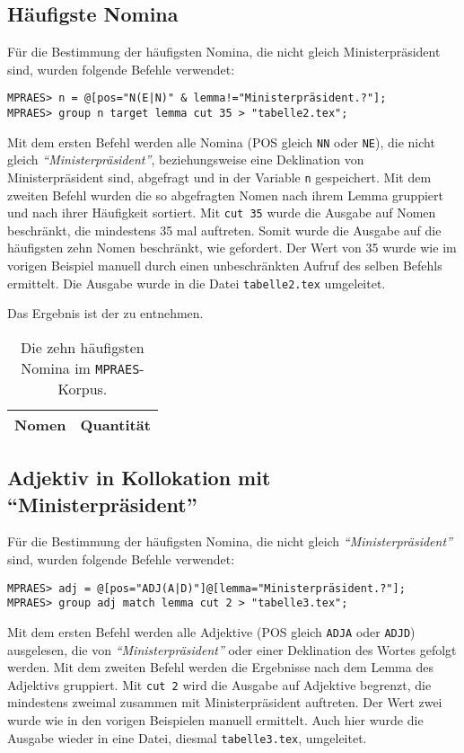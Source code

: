 \documentclass[%
	type=document,%
  	style=article,%
  	media=print,
  	pages=oneside,%
  	prefixLecturer=Dozenten:,
  	author=multiple,
]{unihildesheim} %
\begin{document}
\subsection{Häufigste Nomina}
Für die Bestimmung der häufigsten Nomina, die nicht gleich Ministerpräsident
sind, wurden folgende Befehle verwendet:
\begin{Verbatim}[frame=single,label=CQP,commandchars=\\\{\}]
MPRAES> n = @[pos="N(E|N)" & lemma!="Ministerpräsident.?"];
MPRAES> group n target lemma cut 35 > "tabelle2.tex";
\end{Verbatim}

Mit dem ersten Befehl werden alle Nomina (POS gleich \texttt{NN} oder
\texttt{NE}), die nicht gleich \textit{"`Ministerpräsident"'}, beziehungsweise eine
Deklination von Ministerpräsident sind, abgefragt und in der Variable \texttt{n}
gespeichert. Mit dem zweiten Befehl wurden die so abgefragten Nomen nach ihrem Lemma gruppiert und
nach ihrer Häufigkeit sortiert. Mit \texttt{cut 35} wurde die Ausgabe auf Nomen
beschränkt, die mindestens 35 mal auftreten. Somit wurde die Ausgabe auf die
häufigsten zehn Nomen beschränkt, wie gefordert. Der Wert von 35 wurde wie im
vorigen Beispiel manuell durch einen unbeschränkten Aufruf des selben
Befehls ermittelt. Die Ausgabe wurde in die Datei \texttt{tabelle2.tex}
umgeleitet.

Das Ergebnis ist der  zu entnehmen.
\begin{table}[!hpb]\label{t}
	\center
	\begin{tabularx}{0.35\textwidth}{lr}
		\toprule
		\textbf{Nomen} & \textbf{Quantität}\\
		\midrule
		
		\bottomrule
	\end{tabularx}
	\caption{Die zehn häufigsten Nomina im \texttt{MPRAES}-Korpus.}
	\label{tab:nomina}
\end{table}

\subsection{Adjektiv in Kollokation mit "`Ministerpräsident"'}
Für die Bestimmung der häufigsten Nomina, die nicht gleich
\textit{"`Ministerpräsident"'} sind, wurden folgende Befehle verwendet:
\begin{Verbatim}[frame=single,label=CQP,commandchars=\\\{\}]
MPRAES> adj = @[pos="ADJ(A|D)"]@[lemma="Ministerpräsident.?"];
MPRAES> group adj match lemma cut 2 > "tabelle3.tex";
\end{Verbatim}
Mit dem ersten Befehl werden alle Adjektive (POS gleich \texttt{ADJA} oder
\texttt{ADJD}) ausgelesen, die von \textit{"`Ministerpräsident"'} oder einer
Deklination des Wortes gefolgt werden. Mit dem zweiten Befehl werden die
Ergebnisse nach dem Lemma des Adjektivs gruppiert. Mit \texttt{cut 2} wird die Ausgabe auf Adjektive begrenzt,
die mindestens zweimal zusammen mit Ministerpräsident auftreten. Der Wert zwei
wurde wie in den vorigen Beispielen manuell ermittelt. Auch hier wurde die Ausgabe
wieder in eine Datei, diesmal \texttt{tabelle3.tex}, umgeleitet. 
\end{document}
